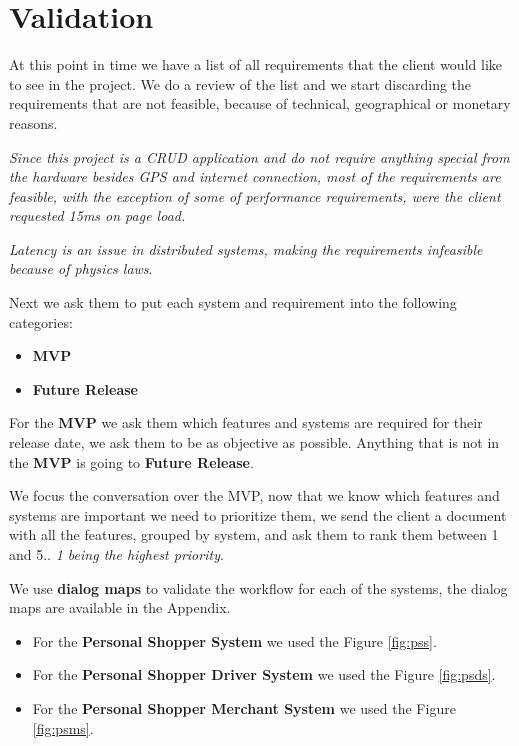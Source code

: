 \section{Validation }
At this point in time we have a list of all requirements that the client would 
like to see in the project. We do a review of the list and we start discarding 
the requirements that are not feasible, because of technical, geographical or 
monetary reasons. \newline

\noindent \textit{Since this project is a CRUD application \cite{crud} and do 
not require anything special from the hardware besides GPS and internet 
connection, most of the requirements are feasible, with the exception of 
some of performance requirements, were the client 
requested 15ms on page load.}\newline

\noindent \textit{Latency is an issue in distributed systems, making the 
requirements infeasible because of physics laws}. \newline

\noindent Next we ask them to put each system and requirement into the 
following categories:
\begin{itemize}
    \item \textbf{MVP} \cite{mvp}
    \item \textbf{Future Release}
\end{itemize}

\noindent For the \textbf{MVP} we ask them which features and systems are 
required for their release date, we ask them to be as objective as possible. 
Anything that is not in the \textbf{MVP} is going to 
\textbf{Future Release}. \newline

\noindent We focus the conversation over the MVP, now that we know which 
features and systems are important we need to prioritize them,  we send the 
client a document with all the features, grouped by system, and ask them to 
rank them between 1 and 5.. \textit{1 being the highest priority}. \newline

\noindent We use \textbf{dialog maps} to validate the workflow for each of 
the systems, the dialog maps are available in the Appendix. 
\begin{itemize}
    \item For the \textbf{Personal Shopper System} we used 
    the Figure \ref{fig:pss}. 
    \item For the \textbf{Personal Shopper Driver System} we used 
    the Figure \ref{fig:psds}. 
    \item For the \textbf{Personal Shopper Merchant System} we used 
    the Figure \ref{fig:psms}. 
\end{itemize}
